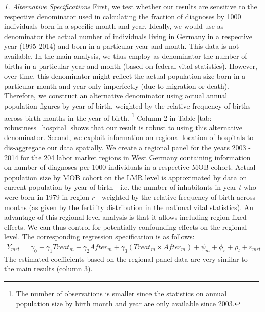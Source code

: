 \documentclass[11pt, a4paper]{article} %
\begin{document}
\textit{1. Alternative Specifications}\newline
First, we test whether our results are sensitive to the respective denominator used in calculating the fraction of diagnoses by 1000 individuals born in a specific month and year. Ideally, we would use as denominator the actual number of individuals living in Germany in a respective year (1995-2014) and born in a particular year and month. This data is not available. In the main analysis, we thus employ as denominator the number of births in a particular year and month (based on federal vital statistics). However, over time, this denominator might reflect the actual population size born in a particular month and year only imperfectly (due to migration or death). Therefore, we construct an alternative denominator using actual annual population figures by year of birth, weighted by the relative frequency of births across birth months in the year of birth. \footnote{The number of observations is smaller since the statistics on annual population size by birth month and year are only available since 2003.}
Column 2 in Table \ref{tab: robustness_hospital} shows that our result is robust to using this alternative denominator.\newline
Second, we exploit information on regional location of hospitals to dis-aggregate our data spatially. We create a regional panel for the years 2003 - 2014 for the 204 labor market regions in West Germany containing information on number of diagnoses per 1000 individuals in a respective MOB cohort. Actual population size by MOB cohort on the LMR level is approximated by data on current population by year of birth - i.e. the number of inhabitants in year $t$ who were born in 1979 in region $r$ - weighted by the relative frequency of birth across months (as given by the fertility distribution in the national vital statistics). An advantage of this regional-level analysis is that it allows including region fixed effects. We can thus control for potentially confounding effects on the regional level. The corresponding regression specification is as follows: 
\bigskip
\begin{align}
Y_{mrt} =\ \gamma_0 + \gamma_1 Treat_{m} + \gamma_2 After_{m} + \gamma_3 (Treat_{m} \times After_{m}) + \psi_m + \phi_r + \rho_t + \varepsilon_{mrt} \label{eq:DD_LMR}
\end{align}
The estimated coefficients based on the regional panel data are very similar to the main results (column 3). \newline
\end{document}
